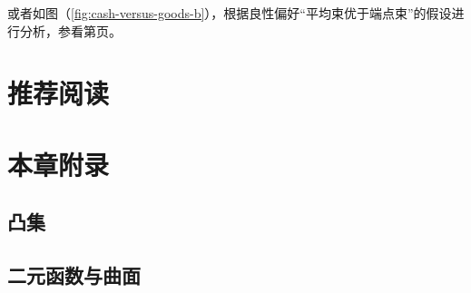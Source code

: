 或者如图（\ref{fig:cash-versus-goods-b}），根据良性偏好“平均束优于端点束”的假设进行分析，参看第\pageref{sec:well-behaved-preference}页。


\section*{推荐阅读}



\newpage
\section*{本章附录}
\label{sec:appendix-preferences-and-indifferent-curves}

\subsection*{凸集}


\subsection*{二元函数与曲面}